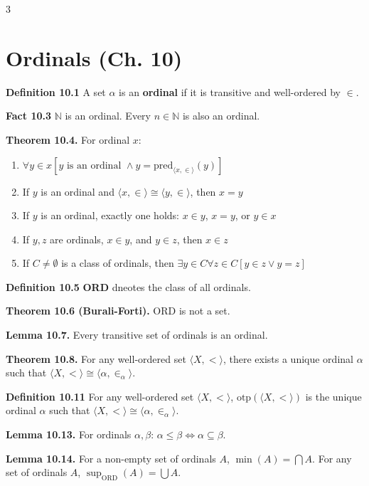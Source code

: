 \documentclass[landscape,8pt]{article}
\newcommand{\ot}{\text{otp}}
\renewcommand{\iff}{\Leftrightarrow}
\begin{document}
\begin{multicols}{3}
	\section*{\centering Ordinals (Ch. 10)}

	\noindent\textbf{Definition 10.1} A set $\alpha$ is an \textbf{ordinal} if it is transitive and well-ordered by $\in$.

	\noindent\textbf{Fact 10.3} $\mathbb{N}$ is an ordinal. Every $n \in \mathbb{N}$ is also an ordinal.

	\noindent\textbf{Theorem 10.4.} For ordinal $x$:
	\begin{enumerate}[noitemsep,topsep=0pt]
		\item $\forall y \in x[y \text{ is an ordinal } \wedge y = \text{pred}_{\langle x, \in \rangle}(y)]$
		\item If $y$ is an ordinal and $\langle x, \in \rangle \cong \langle y, \in \rangle$, then $x = y$
		\item If $y$ is an ordinal, exactly one holds: $x \in y$, $x = y$, or $y \in x$
		\item If $y, z$ are ordinals, $x \in y$, and $y \in z$, then $x \in z$
		\item If $C \neq \emptyset$ is a class of ordinals, then $\exists y \in C \forall z \in C[y \in z \vee y = z]$
	\end{enumerate}

	\noindent\textbf{Definition 10.5} \textbf{ORD} dneotes the class of all ordinals.

	\noindent\textbf{Theorem 10.6 (Burali-Forti).} $\text{ORD}$ is not a set.

	\noindent\textbf{Lemma 10.7.} Every transitive set of ordinals is an ordinal.

	\noindent\textbf{Theorem 10.8.} For any well-ordered set $\langle X, < \rangle$, there exists a unique ordinal $\alpha$ such that $\langle X, < \rangle \cong \langle \alpha, \in_\alpha \rangle$.

	\noindent\textbf{Definition 10.11} For any well-ordered set $\langle X, < \rangle$, $\ot(\langle X, < \rangle)$ is the unique ordinal $\alpha$ such that $\langle X, < \rangle \cong \langle \alpha, \in_\alpha \rangle$.

	\noindent\textbf{Lemma 10.13.} For ordinals $\alpha, \beta$: $\alpha \leq \beta \iff \alpha \subseteq \beta$.

	\noindent\textbf{Lemma 10.14.} For a non-empty set of ordinals $A$, $\min(A) = \bigcap A$. For any set of ordinals $A$, $\sup_{\text{ORD}}(A) = \bigcup A$.


\end{multicols}
\end{document}
